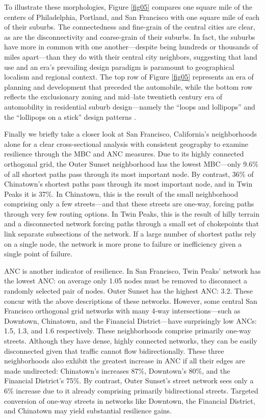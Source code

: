 \documentclass[Afour,sageh,times]{sagej}
\renewcommand{\cite}{\citep}
\begin{document}
To illustrate these morphologies, Figure \ref{fig05} compares one square mile of the centers of Philadelphia, Portland, and San Francisco with one square mile of each of their suburbs. The connectedness and fine-grain of the central cities are clear, as are the disconnectivity and coarse-grain of their suburbs. In fact, the suburbs have more in common with one another---despite being hundreds or thousands of miles apart---than they do with their central city neighbors, suggesting that land use and an era's prevailing design paradigm is paramount to geographical localism and regional context. The top row of Figure \ref{fig05} represents an era of planning and development that preceded the automobile, while the bottom row reflects the exclusionary zoning and mid--late twentieth century era of automobility in residential suburb design---namely the \enquote{loops and lollipops} and the \enquote{lollipops on a stick} design patterns \cite{southworth_streets_1997}.

Finally we briefly take a closer look at San Francisco, California's neighborhoods alone for a clear cross-sectional analysis with consistent geography to examine resilience through the MBC and ANC measures. Due to its highly connected orthogonal grid, the Outer Sunset neighborhood has the lowest MBC---only 9.6\% of all shortest paths pass through its most important node. By contrast, 36\% of Chinatown's shortest paths pass through its most important node, and in Twin Peaks it is 37\%. In Chinatown, this is the result of the small neighborhood comprising only a few streets---and that these streets are one-way, forcing paths through very few routing options. In Twin Peaks, this is the result of hilly terrain and a disconnected network forcing paths through a small set of chokepoints that link separate subsections of the network. If a large number of shortest paths rely on a single node, the network is more prone to failure or inefficiency given a single point of failure.

ANC is another indicator of resilience. In San Francisco, Twin Peaks' network has the lowest ANC: on average only 1.05 nodes must be removed to disconnect a randomly selected pair of nodes. Outer Sunset has the highest ANC: 3.2. These concur with the above descriptions of these networks. However, some central San Francisco orthogonal grid networks with many 4-way intersections---such as Downtown, Chinatown, and the Financial District---have surprisingly low ANCs: 1.5, 1.3, and 1.6 respectively. These neighborhoods comprise primarily one-way streets. Although they have dense, highly connected networks, they can be easily disconnected given that traffic cannot flow bidirectionally. These three neighborhoods also exhibit the greatest increase in ANC if all their edges are made undirected: Chinatown's increases 87\%, Downtown's 80\%, and the Financial District's 75\%. By contrast, Outer Sunset's street network sees only a 6\% increase due to it already comprising primarily bidirectional streets. Targeted conversion of one-way streets in networks like Downtown, the Financial District, and Chinatown may yield substantial resilience gains.
\end{document}
